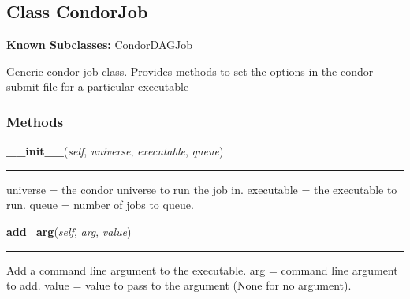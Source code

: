 \subsection{Class CondorJob}

    \label{pipeline:CondorJob}
\textbf{Known Subclasses:} CondorDAGJob

Generic condor job class. Provides methods to set the options in the 
condor submit file for a particular executable



  \subsubsection{Methods}

    \label{pipeline:CondorJob:__init__}
    \vspace{0.5ex}

    \noindent\begin{boxedminipage}{\textwidth}

    \raggedright \textbf{\_\_init\_\_}(\textit{self}, \textit{universe}, \textit{executable}, \textit{queue})

    \vspace{-1.5ex}

    \rule{\textwidth}{0.5\fboxrule}
    universe = the condor universe to run the job in. executable = the 
    executable to run. queue = number of jobs to queue.

    \vspace{1ex}

    \end{boxedminipage}

    \label{pipeline:CondorJob:add_arg}
    \vspace{0.5ex}

    \noindent\begin{boxedminipage}{\textwidth}

    \raggedright \textbf{add\_arg}(\textit{self}, \textit{arg}, \textit{value})

    \vspace{-1.5ex}

    \rule{\textwidth}{0.5\fboxrule}
    Add a command line argument to the executable. arg = command line 
    argument to add. value = value to pass to the argument (None for no 
    argument).

    \vspace{1ex}

    \end{boxedminipage}

